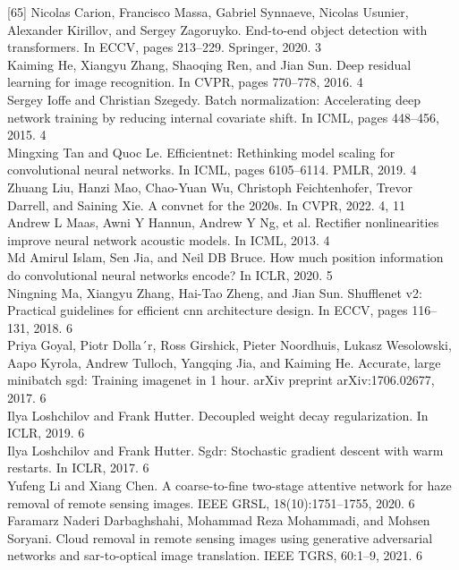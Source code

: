 \documentclass{article}
\begin{document}
[65] Nicolas Carion, Francisco Massa, Gabriel Synnaeve, Nicolas Usunier, Alexander Kirillov, and Sergey Zagoruyko. End-to-end object detection with transformers. In ECCV, pages 213–229. Springer, 2020. 3\\
[66] Kaiming He, Xiangyu Zhang, Shaoqing Ren, and Jian Sun. Deep residual learning for image recognition. In CVPR, pages 770–778, 2016. 4\\
[67] Sergey Ioffe and Christian Szegedy. Batch normalization: Accelerating deep network training by reducing internal covariate shift. In ICML, pages 448–456, 2015. 4\\
[68] Mingxing Tan and Quoc Le. Efficientnet: Rethinking model scaling for convolutional neural networks. In ICML, pages 6105–6114. PMLR, 2019. 4\\
[69] Zhuang Liu, Hanzi Mao, Chao-Yuan Wu, Christoph Feichtenhofer, Trevor Darrell, and Saining Xie. A convnet for the 2020s. In CVPR, 2022. 4, 11\\
[70] Andrew L Maas, Awni Y Hannun, Andrew Y Ng, et al. Rectifier nonlinearities improve neural network acoustic models. In ICML, 2013. 4\\
[71] Md Amirul Islam, Sen Jia, and Neil DB Bruce. How much position information do convolutional neural networks encode? In ICLR, 2020. 5\\
[72] Ningning Ma, Xiangyu Zhang, Hai-Tao Zheng, and Jian Sun. Shufflenet v2: Practical guidelines for efficient cnn architecture design. In ECCV, pages 116–131, 2018. 6\\
[73] Priya Goyal, Piotr Dolla´r, Ross Girshick, Pieter Noordhuis, Lukasz Wesolowski, Aapo Kyrola, Andrew Tulloch, Yangqing Jia, and Kaiming He. Accurate, large minibatch sgd: Training imagenet in 1 hour. arXiv preprint arXiv:1706.02677, 2017. 6\\
[74] Ilya Loshchilov and Frank Hutter. Decoupled weight decay regularization. In ICLR, 2019. 6\\
[75] Ilya Loshchilov and Frank Hutter. Sgdr: Stochastic gradient descent with warm restarts. In ICLR, 2017. 6\\
[76] Yufeng Li and Xiang Chen. A coarse-to-fine two-stage attentive network for haze removal of remote sensing images. IEEE GRSL, 18(10):1751–1755, 2020. 6\\
[77] Faramarz Naderi Darbaghshahi, Mohammad Reza Mohammadi, and Mohsen Soryani. Cloud removal in remote sensing images using generative adversarial networks and sar-to-optical image translation. IEEE TGRS, 60:1–9, 2021. 6\\
\end{document}
